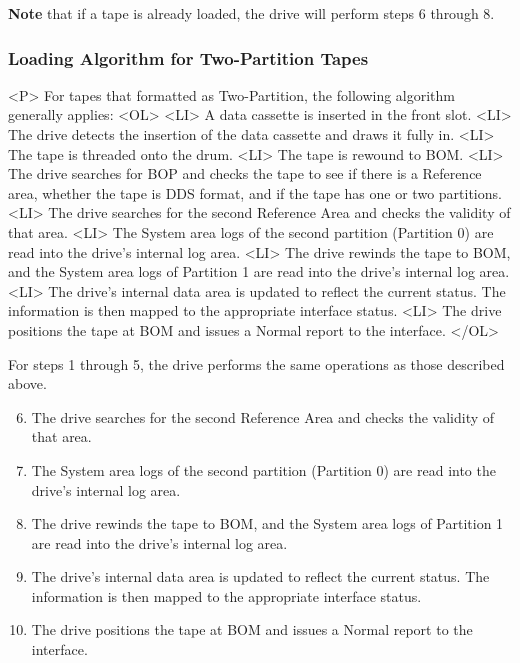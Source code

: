\documentclass[11pt]{article}
\newenvironment{latexonly}{}{}
\begin{document}
{\bf Note} that if a tape is already loaded, the drive will perform steps
6 through 8.

\subsubsection {Loading Algorithm for Two-Partition Tapes}

\begin{htmlonly}
\begin{rawhtml}
<P>
For tapes that formatted as Two-Partition, the following algorithm generally
applies:
<OL>
<LI> A data cassette is inserted in the front slot.
<LI> The drive detects the insertion of the data cassette and draws it
fully in.
<LI> The tape is threaded onto the drum.
<LI> The tape is rewound to BOM.
<LI> The drive searches for BOP and checks the tape to see if there is a
Reference area, whether the tape is DDS format, and if the tape has one or
two partitions.
<LI> The drive searches for the second Reference Area and checks the
validity of that area.
<LI> The System area logs of the second partition (Partition 0) are read
into the drive's internal log area.
<LI> The drive rewinds the tape to BOM, and the System area logs of
Partition 1 are read into the drive's internal log area.
<LI> The drive's internal data area is updated to reflect the current
status. The information is then mapped to the appropriate interface status.
<LI> The drive positions the tape at BOM and issues a Normal report to the
interface.
</OL>
\end{rawhtml}
\end{htmlonly}

\begin {latexonly}

For steps 1 through 5, the drive performs the same operations as those
described above.

\begin {enumerate}

\setcounter {enumi}{5}

\item The drive searches for the second Reference Area and checks the
validity of that area.

\item The System area logs of the second partition (Partition 0) are read
into the drive's internal log area.

\item The drive rewinds the tape to BOM, and the System area logs of
Partition 1 are read into the drive's internal log area.

\item The drive's internal data area is updated to reflect the current
status. The information is then mapped to the appropriate interface status.

\item The drive positions the tape at BOM and issues a Normal report to the
interface.

\end {enumerate}

\end {latexonly}
\end{document}
